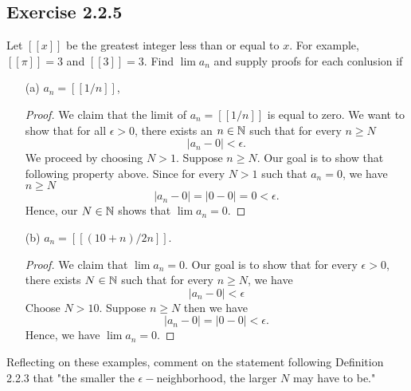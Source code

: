 \subsection{Exercise 2.2.5} 
Let \( [[x]] \) be the greatest integer less than or equal to \( x \). For example, \( [[\pi]] = 3  \) and \( [[3]] = 3 \). Find \( \lim a_n \) and supply proofs for each conlusion if  
\begin{enumerate}
    \item[(a)] \( a_n = [[ 1/n ]]\),
    \begin{proof}
        We claim that the limit of \( a_n = [[ 1 / n ]]\) is equal to zero. We want to show that 
        for all \( \epsilon  > 0 \), there exists an \( n \in \mathbb{N} \) such that for every \( n \geq N \) \[ | a_n - 0 | < \epsilon. \]
        We proceed by choosing \( N > 1 \). Suppose \( n \geq N \). Our goal is to show that following property above. Since for every \( N > 1 \) such that \( a_n = 0 \), we have \( n \geq N \) \[ | a_n - 0 | = | 0 - 0 | = 0 < \epsilon  .\] 
        Hence, our \( N \in \mathbb{N} \) shows that \( \lim a_n =0\).
    \end{proof}
    \item [(b)] \(a_n =  [[ (10+n) / 2n]]\).
        \begin{proof}
        We claim that \( \lim a_n = 0 \). Our goal is to show that for every \( \epsilon  > 0 \), there exists \( N \in \mathbb{N} \) such that for every \( n \geq N \), we have  
        \[ |a_n - 0 | < \epsilon \]
        Choose \( N > 10\). Suppose \( n \geq N \) then we have 
    \[ | a_n - 0 | = |0 - 0| < \epsilon.\]
        Hence, we have \( \lim a_n = 0 \).
        \end{proof}
\end{enumerate}
Reflecting on these examples, comment on the statement following Definition 2.2.3 that "the smaller the \(\epsilon-\)neighborhood, the larger \( N \) may have to be."

